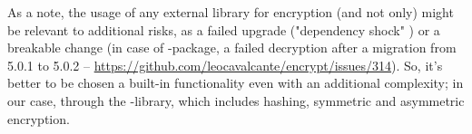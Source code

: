\noindent As a note, the usage of any external library for encryption (and not only) might be relevant to additional 
risks, as a failed upgrade ("dependency shock" \cite{Inki23}) or a breakable change (in case of -package, a 
failed decryption after a migration from 5.0.1 to 5.0.2 -- 
\href{https://github.com/leocavalcante/encrypt/issues/314}{https://github.com/leocavalcante/encrypt/issues/314}).
So, it's better to be chosen a built-in functionality even with an additional complexity; in our case, through the 
-library, which includes hashing, symmetric and asymmetric encryption.
